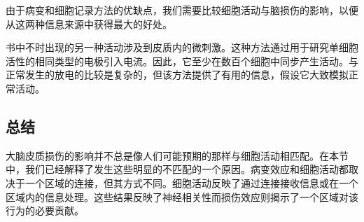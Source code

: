 \par
由于病变和细胞记录方法的优缺点，我们需要比较细胞活动与脑损伤的影响，以便从这两种信息来源中获得最大的好处。
\par
书中不时出现的另一种活动涉及到皮质内的微刺激。这种方法通过用于研究单细胞活性的相同类型的电极引入电流。因此，它至少在数百个细胞中同步产生活动。与正常发生的放电的比较是复杂的，但该方法提供了有用的信息，假设它大致模拟正常活动。
\subsection{总结}
大脑皮质损伤的影响并不总是像人们可能预期的那样与细胞活动相匹配。在本节中，我们已经解释了发生这些明显的不匹配的一个原因。病变效应和细胞活动都取决于一个区域的连接，但其方式不同。细胞活动反映了通过连接接收信息或在一个区域内的信息处理。这些结果反映了神经相关性而损伤效应则揭示了一个区域对该行为的必要贡献。


